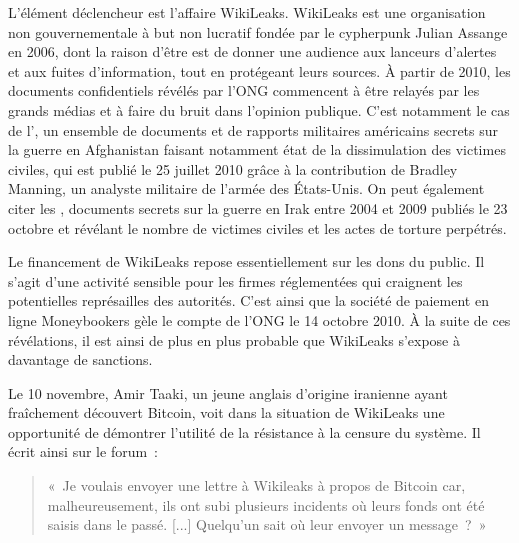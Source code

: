 L'élément déclencheur est l'affaire WikiLeaks. WikiLeaks est une organisation non gouvernementale à but non lucratif fondée par le cypherpunk Julian Assange en 2006, dont la raison d'être est de donner une audience aux lanceurs d'alertes et aux fuites d'information, tout en protégeant leurs sources. À partir de 2010, les documents confidentiels révélés par l'ONG commencent à être relayés par les grands médias et à faire du bruit dans l'opinion publique. C'est notamment le cas de l', un ensemble de documents et de rapports militaires américains secrets sur la guerre en Afghanistan faisant notamment état de la dissimulation des victimes civiles, qui est publié le 25 juillet 2010 grâce à la contribution de Bradley Manning, un analyste militaire de l'armée des États-Unis. On peut également citer les , documents secrets sur la guerre en Irak entre 2004 et 2009 publiés le 23 octobre et révélant le nombre de victimes civiles et les actes de torture perpétrés. %

Le financement de WikiLeaks repose essentiellement sur les dons du public. Il s'agit d'une activité sensible pour les firmes réglementées qui craignent les potentielles représailles des autorités. C'est ainsi que la société de paiement en ligne Moneybookers gèle le compte de l'ONG le 14 octobre 2010. À la suite de ces révélations, il est ainsi de plus en plus probable que WikiLeaks s'expose à davantage de sanctions.

Le 10 novembre, Amir Taaki, un jeune anglais d'origine iranienne ayant fraîchement découvert Bitcoin, voit dans la situation de WikiLeaks une opportunité de démontrer l'utilité de la résistance à la censure du système. Il écrit ainsi sur le forum~:

\begin{quote}
«~Je voulais envoyer une lettre à Wikileaks à propos de Bitcoin car, malheureusement, ils ont subi plusieurs incidents où leurs fonds ont été saisis dans le passé. [...] Quelqu'un sait où leur envoyer un message~?~»
\end{quote}

